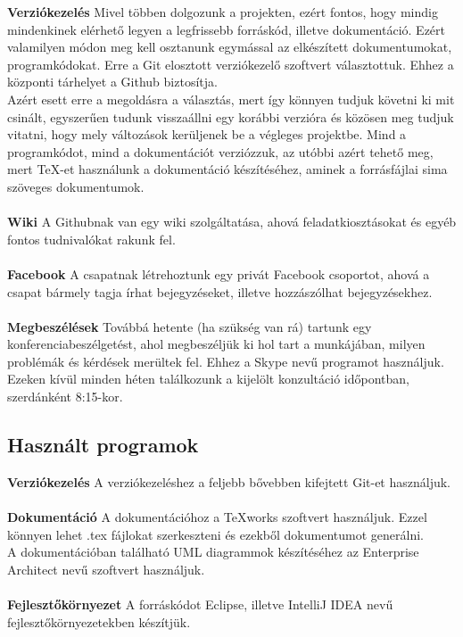 \textbf{Verziókezelés} Mivel többen dolgozunk a projekten, ezért fontos, hogy mindig mindenkinek elérhető legyen a legfrissebb forráskód, illetve dokumentáció. Ezért valamilyen módon meg kell osztanunk egymással az elkészített dokumentumokat, programkódokat. Erre a Git elosztott verziókezelő szoftvert választottuk. Ehhez a központi tárhelyet a Github biztosítja. \\
Azért esett erre a megoldásra a választás, mert így könnyen tudjuk követni ki mit csinált, egyszerűen tudunk visszaállni egy korábbi verzióra és közösen meg tudjuk vitatni, hogy mely változások kerüljenek be a végleges projektbe.
Mind a programkódot, mind a dokumentációt verziózzuk, az utóbbi azért tehető meg, mert TeX-et használunk a dokumentáció készítéséhez, aminek a forrásfájlai sima szöveges dokumentumok.
\\ \\
\textbf{Wiki}
A Githubnak van egy wiki szolgáltatása, ahová feladatkiosztásokat és egyéb fontos tudnivalókat rakunk fel. \\ \\
\textbf{Facebook}
A csapatnak létrehoztunk egy privát Facebook csoportot, ahová a csapat bármely tagja írhat bejegyzéseket, illetve hozzászólhat bejegyzésekhez. \\ \\
\textbf{Megbeszélések}
Továbbá hetente (ha szükség van rá) tartunk egy konferenciabeszélgetést, ahol megbeszéljük ki hol tart a munkájában, milyen problémák és kérdések merültek fel. Ehhez a Skype nevű programot használjuk. \\
Ezeken kívül minden héten találkozunk a kijelölt konzultáció időpontban, szerdánként 8:15-kor.

\subsection{Használt programok}
\textbf{Verziókezelés}
A verziókezeléshez a feljebb bővebben kifejtett Git-et használjuk. \\ \\
\textbf{Dokumentáció}
A dokumentációhoz a TeXworks szoftvert használjuk. Ezzel könnyen lehet .tex fájlokat szerkeszteni és ezekből dokumentumot generálni. \\
A dokumentációban található UML diagrammok készítéséhez az Enterprise Architect nevű szoftvert használjuk. \\ \\
\textbf{Fejlesztőkörnyezet}
A forráskódot Eclipse, illetve IntelliJ IDEA nevű fejlesztőkörnyezetekben készítjük.

